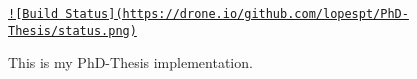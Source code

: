 \href{https://drone.io/github.com/lopespt/PhD-Thesis/latest}{\tt !\mbox{[}Build Status\mbox{]}(https\+://drone.\+io/github.\+com/lopespt/\+Ph\+D-\/\+Thesis/status.\+png)}

This is my Ph\+D-\/\+Thesis implementation. 